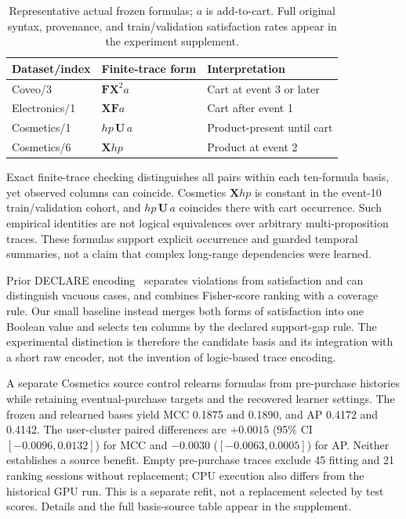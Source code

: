 \documentclass[sigconf,anonymous,nonacm]{acmart}
\newif\ifrevisions
\newcommand{\rev}[1]{\ifrevisions\textcolor{red}{#1}\else#1\fi}
\newenvironment{revblock}{\begingroup\ifrevisions\color{red}\fi}{\endgroup}
\begin{document}
\begin{revblock}
\begin{table}[t]
\centering\footnotesize
\caption{\rev{Representative actual frozen formulas; $a$ is add-to-cart. Full original syntax, provenance, and train/validation satisfaction rates appear in the experiment supplement.}}
\label{tab:actual-formulas}
\begin{tabular}{lll}\toprule Dataset/index & Finite-trace form & Interpretation \\
\midrule
Coveo/3 & $\mathbf{F}\mathbf{X}^{2}a$ & Cart at event 3 or later \\
Electronics/1 & $\mathbf{X}\mathbf{F}a$ & Cart after event 1 \\
Cosmetics/1 & $hp\,\mathbf{U}\,a$ & Product-present until cart \\
Cosmetics/6 & $\mathbf{X}hp$ & Product at event 2 \\
\bottomrule\end{tabular}
\end{table}
Exact finite-trace checking distinguishes all pairs within each ten-formula basis, yet observed columns can coincide. Cosmetics $\mathbf{X}hp$ is constant in the event-10 train/validation cohort, and $hp\,\mathbf{U}\,a$ coincides there with cart occurrence. Such empirical identities are not logical equivalences over arbitrary multi-proposition traces. These formulas support explicit occurrence and guarded temporal summaries, not a claim that complex long-range dependencies were learned.

Prior DECLARE encoding~\cite{di2022making} separates violations from satisfaction and can distinguish vacuous cases, and combines Fisher-score ranking with a coverage rule. Our small baseline instead merges both forms of satisfaction into one Boolean value and selects ten columns by the declared support-gap rule. The experimental distinction is therefore the candidate basis and its integration with a short raw encoder, not the invention of logic-based trace encoding.

A separate Cosmetics source control relearns formulas from pre-purchase histories while retaining eventual-purchase targets and the recovered learner settings. The frozen and relearned bases yield MCC 0.1875 and 0.1890, and AP 0.4172 and 0.4142. The user-cluster paired differences are $+0.0015$ (95\% CI $[-0.0096,0.0132]$) for MCC and $-0.0030$ ($[-0.0063,0.0005]$) for AP. Neither establishes a source benefit. Empty pre-purchase traces exclude 45 fitting and 21 ranking sessions without replacement; CPU execution also differs from the historical GPU run. This is a separate refit, not a replacement selected by test scores. Details and the full basis-source table appear in the supplement.


\end{revblock}
\end{document}
